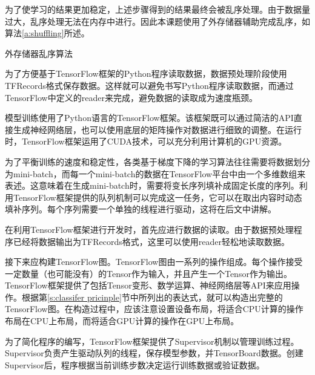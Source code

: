 为了使学习的结果更加稳定，上述步骤得到的结果最终会被乱序处理。由于数据量过大，乱序处理无法在内存中进行。因此本课题使用了外存储器辅助完成乱序，如算法\ref{a:shuffling}所述。

\begin{algorithm}[h]
	\caption{外存储器乱序算法}
	\label{a:shuffling}
\end{algorithm}

为了方便基于TensorFlow框架的Python程序读取数据，数据预处理阶段使用TFRecords格式保存数据。这样就可以避免书写Python程序读取数据，而通过TensorFlow中定义的reader来完成，避免数据的读取成为速度瓶颈。

\label{s:classifer training}
模型训练使用了Python语言的TensorFlow框架。该框架既可以通过简洁的API直接生成神经网络层，也可以使用底层的矩阵操作对数据进行细致的调整。在运行时，TensorFlow框架运用了CUDA技术，可以充分利用计算机的GPU资源。

为了平衡训练的速度和稳定性，各类基于梯度下降的学习算法往往需要将数据划分为mini-batch，而每一个mini-batch的数据在TensorFlow平台中由一个多维数组来表述。这意味着在生成mini-batch时，需要将变长序列填补成固定长度的序列。利用TensorFlow框架提供的队列机制可以完成这一任务，它可以在取出内容时动态填补序列。每个序列需要一个单独的线程进行驱动，这将在后文中讲解。

在利用TensorFlow框架进行开发时，首先应进行数据的读取。由于数据预处理程序已经将数据输出为TFRecords格式，这里可以使用reader轻松地读取数据。

接下来应构建TensorFlow图。TensorFlow图由一系列的操作组成。每个操作接受一定数量（也可能没有）的Tensor作为输入，并且产生一个Tensor作为输出。TensorFlow框架提供了包括Tensor变形、数学运算、神经网络层等API来应用操作。根据第\ref{s:classifer pricinple}节中所列出的表达式，就可以构造出完整的TensorFlow图。在构造过程中，应该注意设置设备布局，将适合CPU计算的操作布局在CPU上布局，而将适合GPU计算的操作在GPU上布局。

为了简化程序的编写，TensorFlow框架提供了Supervisor机制以管理训练过程。Supervisor负责产生驱动队列的线程，保存模型参数，并TensorBoard数据。创建Supervisor后，程序根据当前训练步数决定运行训练数据或验证数据。

